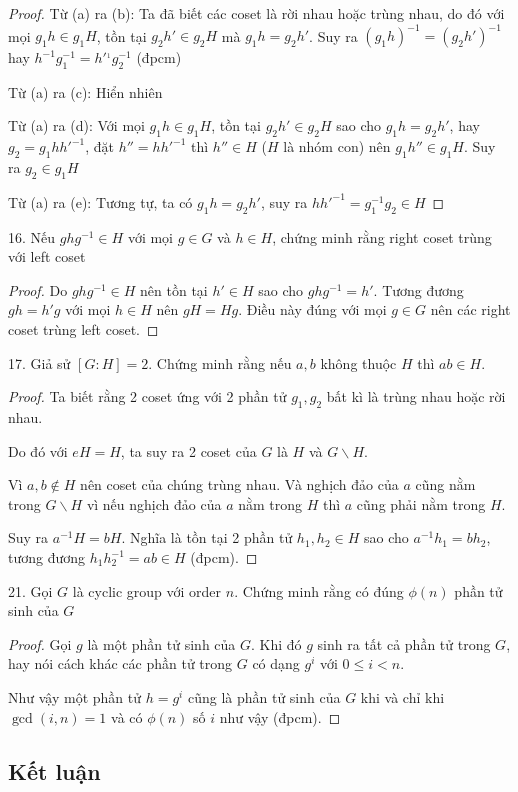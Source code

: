 \begin{proof}
    Từ (a) ra (b): Ta đã biết các coset là rời nhau hoặc trùng nhau, do đó với mọi $g_1 h \in g_1 H$, tồn tại $g_2 h' \in g_2 H$ mà $g_1 h = g_2 h'$. Suy ra $(g_1 h)^{-1} = (g_2 h')^{-1}$ hay $h^{-1} g_1^{-1} = h'^{_1} g_2^{-1}$ (đpcm)

    Từ (a) ra (c): Hiển nhiên

    Từ (a) ra (d): Với mọi $g_1 h \in g_1 H$, tồn tại $g_2 h' \in g_2 H$ sao cho $g_1 h = g_2 h'$, hay $g_2 = g_1 h h'^{-1}$, đặt $h'' = h h'^{-1}$ thì $h'' \in H$ ($H$ là nhóm con) nên $g_1 h'' \in g_1 H$. Suy ra $g_2 \in g_1 H$

    Từ (a) ra (e): Tương tự, ta có $g_1 h = g_2 h'$, suy ra $h h'^{-1}= g_1^{-1} g_2 \in H$

\end{proof}


16. Nếu $g h g^{-1} \in H$ với mọi $g \in G$ và $h \in H$, chứng minh rằng right coset trùng với left coset

\begin{proof}
    Do $g h g^{-1} \in H$ nên tồn tại $h' \in H$ sao cho $g h g^{-1} = h'$. Tương đương $g h = h' g$ với mọi $h \in H$ nên $g H = H g$. Điều này đúng với mọi $g \in G$ nên các right coset trùng left coset.
\end{proof}

17. Giả sử $[G:H]=2$. Chứng minh rằng nếu $a, b$ không thuộc $H$ thì $ab \in H$.

\begin{proof}
    Ta biết rằng 2 coset ứng với 2 phần tử $g_1, g_2$ bất kì là trùng nhau hoặc rời nhau.

    Do đó với $eH = H$, ta suy ra 2 coset của $G$ là $H$ và $G \backslash H$.

    Vì $a, b \not\in H$ nên coset của chúng trùng nhau. Và nghịch đảo của $a$ cũng nằm trong $G \backslash H$ vì nếu nghịch đảo của $a$ nằm trong $H$ thì $a$ cũng phải nằm trong $H$.

    Suy ra $a^{-1} H = b H$. Nghĩa là tồn tại 2 phần tử $h_1, h_2 \in H$ sao cho $a^{-1} h_1 = b h_2$, tương đương $h_1 h_2^{-1} = a b \in H$ (đpcm).
\end{proof}

21. Gọi $G$ là cyclic group với order $n$. Chứng minh rằng có đúng $\phi(n)$ phần tử sinh của $G$

\begin{proof}
    Gọi $g$ là một phần tử sinh của $G$. Khi đó $g$ sinh ra tất cả phần tử trong $G$, hay nói cách khác các phần tử trong $G$ có dạng $g^i$ với $0 \leq i < n$.

    Như vậy một phần tử $h = g^i$ cũng là phần tử sinh của $G$ khi và chỉ khi $\gcd(i, n) = 1$ và có $\phi(n)$ số $i$ như vậy (đpcm).

\end{proof}

\subsection{Kết luận}